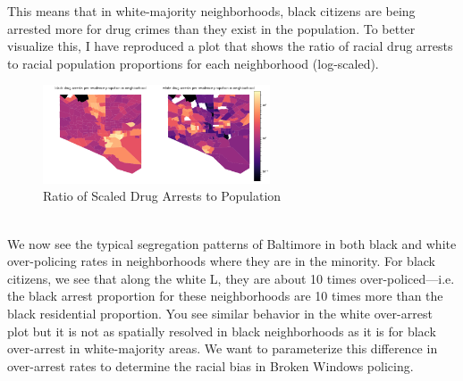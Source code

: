\documentclass[10pt]{article}
\begin{document}
This means that in white-majority neighborhoods, black citizens are being arrested more for drug crimes than they exist in the population. To better visualize this, I have reproduced a plot that shows the ratio of racial drug arrests to racial population proportions for each neighborhood (log-scaled). 
    \begin{figure}[!htb]
    \begin{minipage}{\textwidth}
     \caption{Ratio of Scaled Drug Arrests to Population}
     \centering
     \includegraphics[width=0.6\textwidth]{logdrugpop.png}
   \end{minipage}\hfill
 \end{figure}\\
 We now see the typical segregation patterns of Baltimore in both black and white over-policing rates in neighborhoods where they are in the minority. For black citizens, we see that along the white L, they are about 10 times over-policed---i.e. the black arrest proportion for these neighborhoods are 10 times more than the black residential proportion. You see similar behavior in the white over-arrest plot but it is not as spatially resolved in black neighborhoods as it is for black over-arrest in white-majority areas. We want to parameterize this difference in over-arrest rates to determine the racial bias in Broken Windows policing.
 
\end{document}
